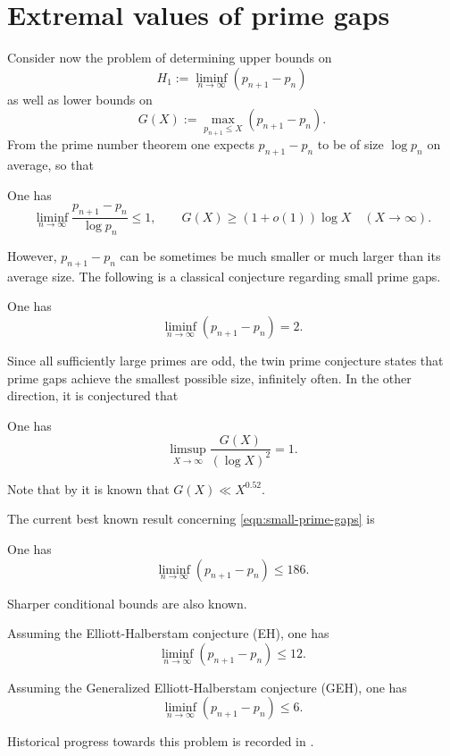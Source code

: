 \section{Extremal values of prime gaps}

Consider now the problem of determining upper bounds on
\begin{equation}\label{eqn:small-prime-gaps}
H_1 := \liminf_{n\to\infty}(p_{n + 1} - p_n)
\end{equation}
as well as lower bounds on
\begin{equation}\label{eqn:large-prime-gaps}
G(X) := \max_{p_{n + 1} \le X}(p_{n + 1} - p_n).
\end{equation}
From the prime number theorem one expects $p_{n + 1} - p_n$ to be of size $\log p_n$ on average, so that
\begin{theorem}
One has
\[
\liminf_{n\to\infty}\frac{p_{n + 1} - p_n}{\log p_n} \le 1,\qquad G(X) \ge (1 + o(1)) \log X\quad (X \to \infty).
\]
\end{theorem}

However, $p_{n + 1} - p_n$ can be sometimes be much smaller or much larger than its average size. The following is a classical conjecture regarding small prime gaps.

\begin{conjecture}
One has
\[
\liminf_{n\to\infty}(p_{n + 1} - p_n) = 2.
\]
\end{conjecture}

Since all sufficiently large primes are odd, the twin prime conjecture states that prime gaps achieve the smallest possible size, infinitely often. In the other direction, it is conjectured that
\begin{conjecture}
One has
\[
\limsup_{X \to \infty}\frac{G(X)}{(\log X)^2} = 1.
\]
\end{conjecture}
Note that by  it is known that $G(X) \ll X^{0.52}$.

The current best known result concerning \eqref{eqn:small-prime-gaps} is
\begin{theorem}
One has
\[
\liminf_{n\to\infty}(p_{n + 1} - p_n) \le 186.
\]
\end{theorem}

Sharper conditional bounds are also known.
\begin{theorem}
Assuming the Elliott-Halberstam conjecture (EH), one has
\[
\liminf_{n\to\infty}(p_{n + 1} - p_n) \le 12.
\]
\end{theorem}
\begin{theorem}
Assuming the Generalized Elliott-Halberstam conjecture (GEH), one has
\[
\liminf_{n\to\infty}(p_{n + 1} - p_n) \le 6.
\]
\end{theorem}
Historical progress towards this problem is recorded in .

